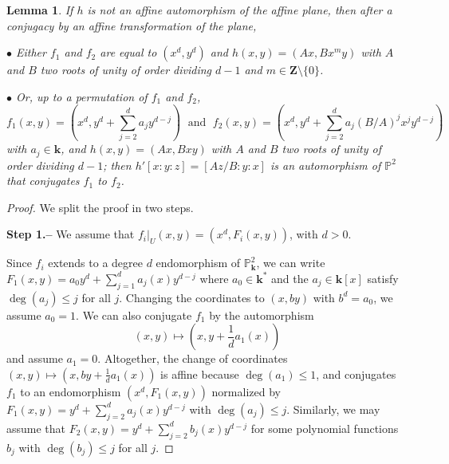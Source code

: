 \documentclass[reqno,oneside,12pt]{amsart}
\theoremstyle{plain}
\newtheorem{lem}[thm]{Lemma}
\theoremstyle{definition}
\def\Z{\mathbf{Z}}
\def\bfk{{\mathbf{k}}}
\def\P{\mathbb{P}}
\begin{document}
{{{{\begin{lem}
If $h$ is not an affine automorphism of the affine plane, then after a conjugacy by an affine transformation of the 
plane,

$\bullet$ Either $f_1$ and $f_2$ are equal to $(x^d,y^d)$ and $h(x,y)=(Ax, Bx^my)$ with $A$ and $B$ two 
roots of unity of order dividing $d-1$ and $m\in \Z\setminus\{0\}$.

$\bullet$ Or, up to a permutation of $f_1$ and $f_2$, 
$$
f_1(x,y) =(x^d, y^d +\sum_{j=2}^d a_j y^{d-j}) \;  {\text{ and }} \; f_2(x,y) =(x^d, y^d +\sum_{j=2}^d a_j (B/A)^j x^{j} y^{d-j})
$$
with $a_j\in \bfk$,
 and $h(x,y)=(Ax, Bxy)$ with $A$ and $B$ two 
roots of unity of order dividing $d-1$; then $h'[x:y:z]=[Az/B:y:x]$ is an automorphism of $\P^2$
that conjugates $f_1$ to $f_2$.
\end{lem}

\begin{proof} We split the proof in two steps.

\smallskip

{\bf{Step 1.--}} 
We  assume that $f_i|_U(x,y)= (x^{d}, F_i(x,y))$, with $d>0$.

Since $f_i$ extends to a degree $d$ endomorphism of $\P^2_\bfk$, we can write $F_1(x,y)=a_0y^d+\sum_{j=1}^da_j(x)y^{d-j}$ where $a_0\in \bfk^*$  and the $a_j\in \bfk[x]$
satisfy $\deg(a_j)\leq j$ for all $j$.
Changing the coordinates to $(x,by)$ with $b^d=a_0$, we assume $a_0=1$. We can also conjugate $f_1$ by the automorphism 
\begin{equation}
(x,y)\mapsto \left( x,y+\frac{1}{d} a_1(x) \right)
\end{equation}
and assume $a_1=0$. Altogether, the change of coordinates $(x,y)\mapsto (x, by+\frac{1}{d} a_1(x))$ is affine because 
$\deg(a_1)\leq 1$, and conjugates $f_1$ to an endomorphism $(x^{d}, F_1(x,y))$ normalized 
by $F_1(x,y)=y^d + \sum_{j=2}^d a_j(x) y^{d-j}$ with $\deg(a_j)\leq j$. 
Similarly, we may assume
that $F_2(x,y)=y^d+\sum_{j=2}^db_j(x)y^{d-j}$ for some polynomial functions $b_j$ with $\deg(b_j)\leq j$ for all $j$.


\end{proof}}}}}
\end{document}
